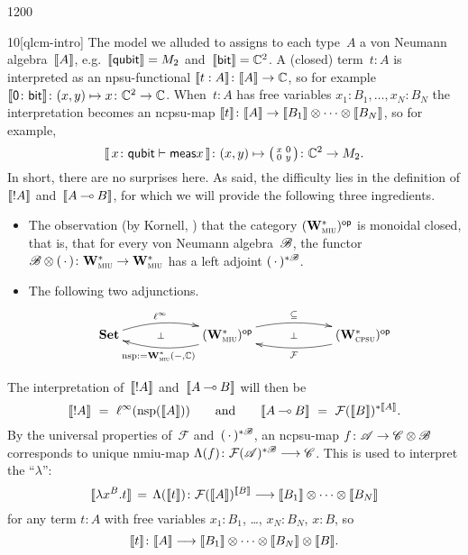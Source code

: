 \begin{parsec}{1200}
\begin{point}{10}[qlcm-intro]
The model
we alluded to
assigns to each type~$A$ a von Neumann algebra~$\llbracket A\rrbracket$,%
e.g.~$\llbracket\mathsf{qubit}\rrbracket=M_2$
and~$\llbracket\mathsf{bit}\rrbracket=\mathbb{C}^2$.
A (closed) term~$t:A$
is interpreted as an npsu-functional $\llbracket t:A\rrbracket\colon \llbracket A\rrbracket\to\mathbb{C}$,
so for example $\llbracket\mathsf{0}\colon \mathsf{bit}\rrbracket\colon
(x,y)\mapsto x\colon \mathbb{C}^2\to\mathbb{C}$.
When~$t:A$ has free variables $x_1:B_1,\dotsc,x_N:B_N$
the interpretation 
becomes an ncpsu-map $\llbracket t\rrbracket\colon \llbracket A\rrbracket\to\llbracket B_1\rrbracket\otimes 
\dotsb \otimes \llbracket B_N\rrbracket$,
so for example,
\begin{equation*}
	\llbracket\, x\colon \mathsf{qubit} \vdash \mathsf{meas} x\,\rrbracket
\colon (x,y)\mapsto
\smash{\bigl(
	\begin{smallmatrix}x& 0 \\ 0 & y
	\end{smallmatrix}\bigr)}
\colon \mathbb{C}^2\to M_2.
\end{equation*}
In short, there are no surprises here.
As said, the difficulty lies
in the definition
of $\llbracket!A\rrbracket$ and~$\llbracket A\mathbin{\multimap} B\rrbracket$,
for which we will provide the following
three ingredients.
\begin{itemize}
\item
The observation (by Kornell, \cite{kornell2012})
that
the category 
${(\mathbf{W}^*_{\text{\textsc{miu}}})}{^{\mathsf{op}}}$
is monoidal closed,
that is,
that
for every von Neumann algebra~$\mathscr{B}$,
the functor
$\mathscr{B}\otimes (\,\cdot\,)\colon 
\mathbf{W}^*_{\text{\textsc{miu}}}\to \mathbf{W}^*_{\text{\textsc{miu}}}$
has a left adjoint
$(\,\cdot\,)^{*\mathscr{B}}$.

\item
The following two adjunctions.
\begin{equation*}
\xymatrix@C=6em{
	\Cat{Set}
	\ar@/^1.0em/[r]^-{\ell^\infty}
	\ar@{}[r]|-{\perp}
	&
	\op{(\W{miu})}
	\ar@/^1.0em/[r]^-{\subseteq}
	\ar@/^1.0em/[l]^-{\nsp:=\W{miu}(-,\C)}
	\ar@{}[r]|-{\perp}
	&
	\op{(\W{cpsu})}
	\ar@/^1.0em/[l]^-{\mathcal{F}}
}
\end{equation*}
\end{itemize}
\end{point}
The interpretation of~$\llbracket!A\rrbracket$
and~$\llbracket A\mathbin{\multimap} B\rrbracket$ will then be
\begin{equation*}
\sem{!A}\ =\ 
\linf(\nsp(\sem{A}))
\qquad\text{and}\qquad
\sem{A\limp B}
\ = \ 
\mathcal{F}(\sem{B})^{*\sem{A}}.
\end{equation*}%
By the universal properties of~$\mathcal{F}$
and~$(\,\cdot\,)^{*\mathscr{B}}$,
an ncpsu-map $f\colon \mathscr{A}\rightarrow \mathscr{C}\otimes \mathscr{B}$
corresponds to unique nmiu-map 
$\Lambda(f)\colon \mathcal{F}(\mathscr{A})^{*\mathscr{B}}\longrightarrow \mathscr{C}$.
This is used to interpret 
the ``$\lambda$'':
\begin{equation*}
    \llbracket\lambda x^B. t\rrbracket
    \,=\, \Lambda(\llbracket t\rrbracket)\colon \mathcal{F}(\llbracket A\rrbracket)^{\llbracket B\rrbracket}
    \longrightarrow\llbracket B_1\rrbracket\otimes\dotsb\otimes\llbracket B_N\rrbracket
\end{equation*}
for any term  $t:A$  with free variables
$x_1:B_1$, \ldots, $x_N:B_N$, $x:B$,
so  
\begin{equation*}
\llbracket t\rrbracket \colon \llbracket A\rrbracket\longrightarrow 
\llbracket B_1\rrbracket\otimes\dotsb\otimes\llbracket B_N\rrbracket\otimes \llbracket B\rrbracket.
\end{equation*}


\end{parsec}
